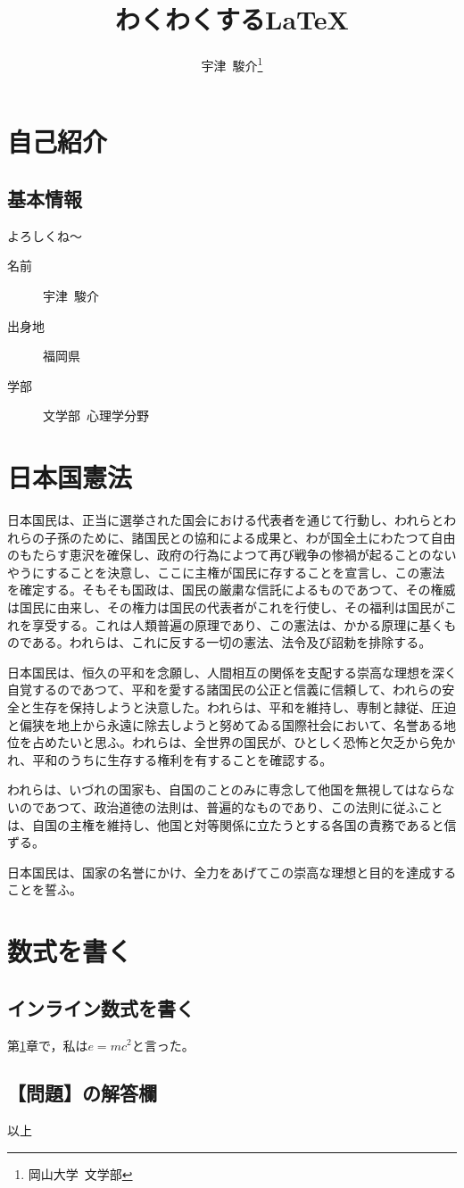 \documentclass[]{jlreq}
\title{わくわくする\LaTeX}
\author{宇津~駿介\thanks{岡山大学\ 文学部}}
\begin{document}
\maketitle

\section{自己紹介}\label{me}
\subsection{基本情報}
よろしくね〜
\begin{description}
  \item[名前] 宇津~駿介
  \item[出身地] 福岡県
  \item [学部] 文学部\ 心理学分野
\end{description}

\section{日本国憲法}
\noindent
{}
日本国民は、正当に選挙された国会における代表者を通じて行動し、われらとわれらの子孫のために、諸国民との協和による成果と、わが国全土にわたつて自由のもたらす恵沢を確保し、政府の行為によつて再び戦争の惨禍が起ることのないやうにすることを決意し、ここに主権が国民に存することを宣言し、この憲法を確定する。そもそも国政は、国民の厳粛な信託によるものであつて、その権威は国民に由来し、その権力は国民の代表者がこれを行使し、その福利は国民がこれを享受する。これは人類普遍の原理であり、この憲法は、かかる原理に基くものである。われらは、これに反する一切の憲法、法令及び詔勅を排除する。

日本国民は、恒久の平和を念願し、人間相互の関係を支配する崇高な理想を深く自覚するのであつて、平和を愛する諸国民の公正と信義に信頼して、われらの安全と生存を保持しようと決意した。われらは、平和を維持し、専制と隷従、圧迫と偏狭を地上から永遠に除去しようと努めてゐる国際社会において、名誉ある地位を占めたいと思ふ。われらは、全世界の国民が、ひとしく恐怖と欠乏から免かれ、平和のうちに生存する権利を有することを確認する。

われらは、いづれの国家も、自国のことのみに専念して他国を無視してはならないのであつて、政治道徳の法則は、普遍的なものであり、この法則に従ふことは、自国の主権を維持し、他国と対等関係に立たうとする各国の責務であると信ずる。

日本国民は、国家の名誉にかけ、全力をあげてこの崇高な理想と目的を達成することを誓ふ。

\section{数式を書く}
\subsection{インライン数式を書く}
第\ref{me}章で，私は$e = mc^{2}$と言った。

\subsection{【問題】の解答欄}
\begin{flushright}
    以上
\end{flushright}
\end{document}
